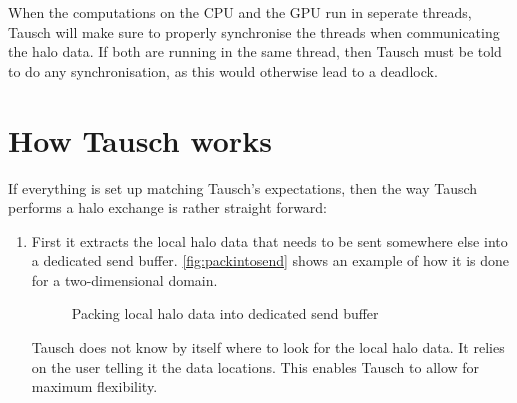\documentclass{article}
\begin{document}
When the computations on the CPU and the GPU run in seperate threads, Tausch will make sure to properly synchronise the threads when communicating the halo data. If both are running in the same thread, then Tausch must be told to do any synchronisation, as this would otherwise lead to a deadlock.

\section{How Tausch works}\label{sec:howtauschworks}

If everything is set up matching Tausch's expectations, then the way Tausch performs a halo exchange is rather straight forward:

\begin{enumerate}
    \item First it extracts the local halo data that needs to be sent somewhere else into a dedicated send buffer. \autoref{fig:packintosend} shows an example of how it is done for a two-dimensional domain.
        \begin{figure}[ht]\centering
            \caption{Packing local halo data into dedicated send buffer \label{fig:packintosend}}
        \end{figure}

        Tausch does not know by itself where to look for the local halo data. It relies on the user telling it the data locations. This enables Tausch to allow for maximum flexibility.


\end{enumerate}
\end{document}
